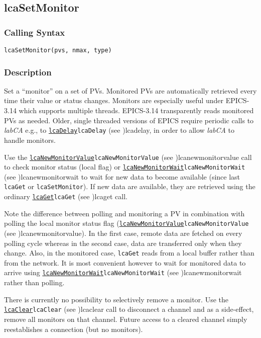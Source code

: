 \documentclass{article}
\newcommand{\sca}{\ita{labCA}}
\newcommand{\com}[1]{{\tt #1}}
\newcommand{\pbrk}{\pagebreak[3]}
\newcommand{\comref}[2]{\hyperref[ref]{\com{#1}}{\com{#1} (see }{)}{#2}}
\newcommand{\ita}[1]{\emph{#1}}
\renewcommand{\pbrk}{}
\begin{document}
\pbrk
\subsection{lcaSetMonitor}
\label{lcasetmonitor}
\subsubsection{Calling Syntax}
\begin{verbatim}
lcaSetMonitor(pvs, nmax, type)
\end{verbatim}
\subsubsection{Description}
Set a ``monitor'' on a set of PVs. Monitored PVs are automatically retrieved
every time their value or status changes. 
Monitors are especially useful under EPICS-3.14 which supports
multiple threads. EPICS-3.14 transparently reads monitored PVs as needed.
Older, single threaded versions of EPICS require periodic calls to \sca{}
e.g., to \comref{lcaDelay}{lcadelay}, in order to allow \sca{} to handle
monitors.

Use the \comref{lcaNewMonitorValue}{lcanewmonitorvalue} call to check
monitor status (local flag) or \comref{lcaNewMonitorWait}{lcanewmonitorwait}
to wait for new data to become available (since last \com{lcaGet} or \com{lcaSetMonitor}).
If new data are available, they are retrieved using
the ordinary \comref{lcaGet}{lcaget} call.

Note the difference between polling and monitoring a PV in combination with
polling the local monitor status flag (\comref{lcaNewMonitorValue}{lcanewmonitorvalue}).
In the first case, remote data are fetched
on every polling cycle whereas in the second case, data are transferred only
when they change.  Also, in the monitored case, \com{lcaGet} reads from a local
buffer rather than from the network. It is most convenient however to wait
for monitored data to arrive using \comref{lcaNewMonitorWait}{lcanewmonitorwait}
rather than polling.

There is currently no possibility to selectively remove a monitor. Use
the \comref{lcaClear}{lcaclear} call to disconnect a channel and as a side-effect,
remove all monitors on that channel. Future access to a cleared channel
simply reestablishes a connection (but no monitors).
\end{document}

